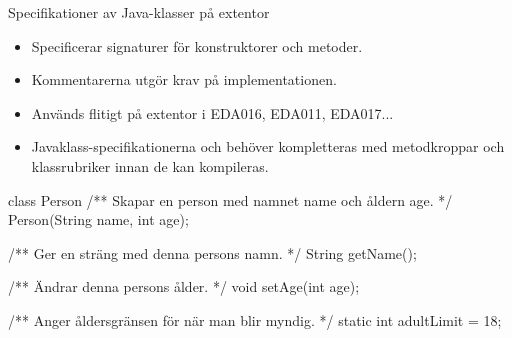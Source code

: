 \begin{Slide}{Specifikationer av Java-klasser på extentor}
\begin{itemize}\small
\item Specificerar signaturer för konstruktorer och metoder.
\item Kommentarerna utgör krav på implementationen.
\item Används flitigt på extentor i EDA016, EDA011, EDA017...
\item Javaklass-specifikationerna   och behöver kompletteras med metodkroppar och klassrubriker innan de kan kompileras.
\end{itemize}
\begin{JavaSpec}{class Person}
/** Skapar en person med namnet name och åldern age. */
Person(String name, int age);

/** Ger en sträng med denna persons namn. */
String getName();

/** Ändrar denna persons ålder. */
void setAge(int age);

/** Anger åldersgränsen för när man blir myndig. */
static int adultLimit = 18;
\end{JavaSpec}
\end{Slide}
